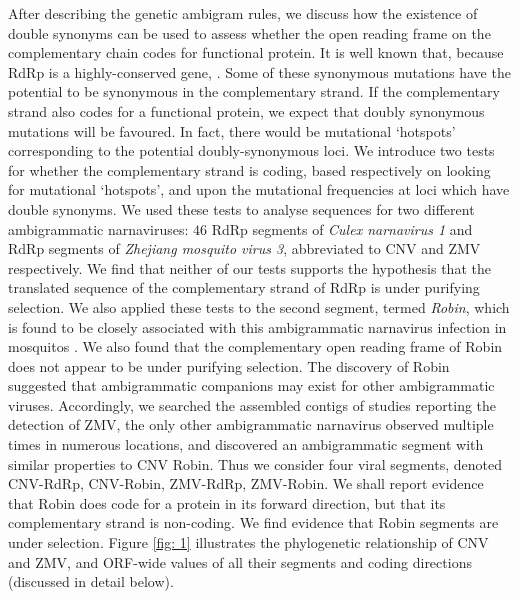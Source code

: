 \documentclass[unnumsec,webpdf,contemporary,large,namedate]{oup-authoring-template}%
\theoremstyle{thmstyleone}%
\theoremstyle{thmstyletwo}%
\theoremstyle{thmstylethree}%
\begin{document}
After describing the genetic ambigram rules, we discuss how the existence of double synonyms
can be used to assess whether the open reading frame on the complementary chain codes for
functional protein. It is well known that, because RdRp is a highly-conserved gene, 
. Some of these synonymous
mutations have the potential to be synonymous in the complementary strand. If the complementary
strand also codes for a functional protein, we expect that doubly synonymous mutations will be
favoured. In fact, there would be mutational \lq hotspots' corresponding to the potential
doubly-synonymous loci. We introduce two tests for whether the complementary strand
is coding, based respectively on looking for mutational \lq hotspots', and upon the mutational
frequencies at loci which have double synonyms. We used these tests to analyse sequences for
two different ambigrammatic narnaviruses: $46$ RdRp segments of \emph{Culex narnavirus 1} and
 RdRp segments of \emph{Zhejiang mosquito virus 3}, abbreviated to CNV and ZMV respectively.
We find that neither of our tests supports the hypothesis
that the translated sequence of the complementary strand of RdRp
is under purifying selection. We also applied these tests to the second segment,
termed \emph{Robin}, which is found to be closely associated with this
ambigrammatic narnavirus infection in mosquitos \citep{Bat+20,Ret+20}. We also found that the
complementary open reading frame of Robin does not appear to be under purifying selection.
The discovery of Robin suggested that ambigrammatic companions may exist for
other ambigrammatic viruses. Accordingly, we searched the assembled contigs of studies reporting the detection of ZMV, the only other ambigrammatic narnavirus observed multiple times in numerous locations,
and discovered an ambigrammatic segment with similar properties to CNV Robin.
Thus we consider four viral segments, denoted CNV-RdRp, CNV-Robin, ZMV-RdRp, ZMV-Robin.
We shall report evidence that Robin does code for a protein in its forward direction, but that its
complementary strand is non-coding. We find evidence that Robin segments are under  selection. Figure \ref{fig: 1} illustrates the phylogenetic relationship of 
CNV and ZMV, and ORF-wide  values of all their segments and coding directions 
(discussed in detail below).
\end{document}
